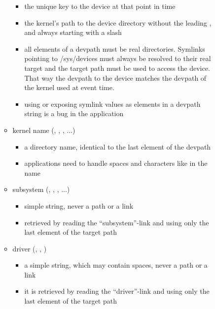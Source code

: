 \documentclass[a4paper,8pt,english]{sphinxmanual}
\begin{document}
\begin{itemize}
\begin{description}
\begin{itemize}
\begin{itemize}
\item {} 
the unique key to the device at that point in time

\item {} 
the kernel's path to the device directory without the leading
, and always starting with a slash

\item {} 
all elements of a devpath must be real directories. Symlinks
pointing to /sys/devices must always be resolved to their real
target and the target path must be used to access the device.
That way the devpath to the device matches the devpath of the
kernel used at event time.

\item {} 
using or exposing symlink values as elements in a devpath string
is a bug in the application

\end{itemize}

\item {} 
kernel name (, , , ...)
\begin{itemize}
\item {} 
a directory name, identical to the last element of the devpath

\item {} 
applications need to handle spaces and characters like \code{!} in
the name

\end{itemize}

\item {} 
subsystem (, , , ...)
\begin{itemize}
\item {} 
simple string, never a path or a link

\item {} 
retrieved by reading the ``subsystem''-link and using only the
last element of the target path

\end{itemize}

\item {} 
driver (, , )
\begin{itemize}
\item {} 
a simple string, which may contain spaces, never a path or a
link

\item {} 
it is retrieved by reading the ``driver''-link and using only the
last element of the target path


\end{itemize}
\end{itemize}
\end{description}
\end{itemize}
\end{document}
